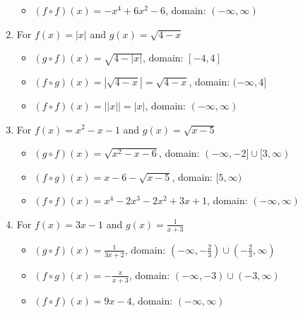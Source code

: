 \begin{enumerate}
\begin{itemize}
\item  $(f \circ f)(x) = -x^4+6x^2-6$, domain: $(-\infty, \infty)$

\end{itemize}

\item For   $f(x) = |x|$ and $g(x) = \sqrt{4-x}$

\begin{itemize}

\item  $(g \circ f)(x) = \sqrt{4-|x|}$, domain: $[-4,4]$

\item  $(f \circ g)(x) =|\sqrt{4-x}| = \sqrt{4-x}$, domain: $(-\infty, 4]$

\item  $(f \circ f)(x) = | |x| | = |x|$, domain: $(-\infty, \infty)$

\end{itemize}


\pagebreak

\item For  $f(x) = x^2-x-1$ and $g(x) = \sqrt{x-5}$ 

\begin{itemize}

\item  $(g \circ f)(x) = \sqrt{x^2-x-6}$, domain: $(-\infty, -2] \cup [3,\infty)$

\item  $(f \circ g)(x) =x-6-\sqrt{x-5}$, domain: $[5,\infty)$

\item  $(f \circ f)(x) =x^4-2x^3-2x^2+3x+1$, domain: $(-\infty, \infty)$

\end{itemize}

\item For   $f(x) = 3x-1$ and $g(x) = \frac{1}{x+3}$

\begin{itemize}

\item  $(g \circ f)(x) = \frac{1}{3x+2}$, domain: $\left(-\infty, -\frac{2}{3}\right) \cup \left(-\frac{2}{3}, \infty\right)$

\item  $(f \circ g)(x) = -\frac{x}{x+3}$, domain: $\left(-\infty, -3\right) \cup \left(-3, \infty\right)$

\item  $(f \circ f)(x) = 9x-4$, domain: $(-\infty, \infty)$


\end{itemize}
\end{enumerate}
